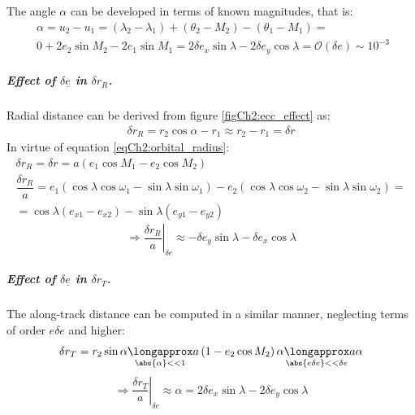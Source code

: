 			\indent The angle $\alpha$ can be developed in terms of known magnitudes, that is:
			\begin{align}
			&\nonumber \alpha = u_2 - u_1 = \left(\lambda_2 - \lambda_1\right) + \left(\theta_2 - M_2\right) - \left(\theta_1 - M_1\right) = \\
			&\label{eqCh2:alpha}0 + 2 e_2 \sin M_2 - 2 e_1 \sin M_1 = 2 \delta e_x \sin\lambda - 2 \delta e_y \cos\lambda = \mathcal{O}(\delta e) \sim 10^{-3} \ \
			\end{align}
			\subparagraph{ Effect of $\delta \underline{e}$ in $\delta r_R$. \\}
			\indent Radial distance can be derived from figure \ref{figCh2:ecc_effect} as:
			\begin{align}
			\nonumber \delta r_R = r_2 \cos\alpha - r_1 \approx r_2 - r_1 = \delta r
			\end{align}
			\indent In virtue of equation \eqref{eqCh2:orbital_radius}:
			\[
			\begin{array}{ccc}
			\delta r_R = \delta r = a \left(e_1 \cos M_1 - e_2 \cos M_2 \right)\\
			\dfrac{\delta r_R}{a} = e_1 \left( \cos\lambda \cos\omega_1 - \sin\lambda\sin\omega_1 \right) - e_2 \left(\cos \lambda \cos\omega_2 - \sin\lambda\sin\omega_2\right) =\\
			= \cos\lambda \left(e_{x1} - e_{x2}\right) - \sin\lambda \left(e_{y1} - e_{y2}\right) 
			\end{array}
			\]
			\begin{equation}
			\label{eqCh2:r_R_ecc}   \Rightarrow \left.\dfrac{\delta r_R}{a}\right\rvert_{\delta e} \approx - \delta e_y\sin\lambda - \delta e_x \cos\lambda
			\end{equation}
			\subparagraph{ Effect of $\delta \underline{e}$ in $\delta r_T$. \\}
			\indent The along-track distance can be computed in a similar manner, neglecting terms of order $e\delta e$ and higher:
			\[
			\delta r_T = r_2 \sin\alpha \underset{\tiny{\abs{\alpha} << 1}}{\longapprox} a \left(1 - e_2 \cos M_2\right) \alpha \underset{\tiny{\abs{e\delta e} << \delta e}}{\longapprox} a\alpha
			\]
			\begin{equation}
			\label{eqCh2:r_T_ecc}\Rightarrow \left.\dfrac{\delta r_T}{a}\right\rvert_{\delta e} \approx \alpha =  2 \delta e_x \sin\lambda - 2 \delta e_y \cos\lambda
			\end{equation}
